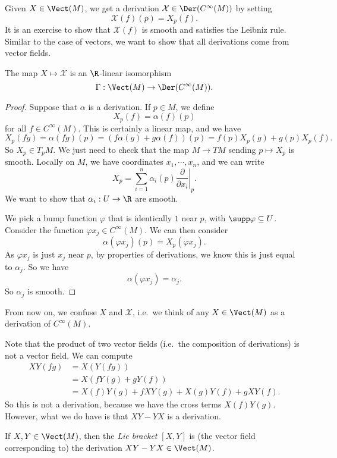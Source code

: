 \documentclass[a4paper]{article}
\begin{document}
Given $X \in \Vect(M)$, we get a derivation $\mathcal{X} \in \Der(C^\infty(M))$ by setting
\[
  \mathcal{X}(f)(p) = X_p(f).
\]
It is an exercise to show that $\mathcal{X}(f)$ is smooth and satisfies the Leibniz rule. Similar to the case of vectors, we want to show that all derivations come from vector fields.

\begin{lemma}
  The map $X \mapsto \mathcal{X}$ is an $\R$-linear isomorphism
  \[
    \Gamma: \Vect(M) \to \Der(C^\infty(M)).
  \]
\end{lemma}

\begin{proof}
  Suppose that $\alpha$ is a derivation. If $p \in M$, we define
  \[
    X_p(f) = \alpha(f)(p)
  \]
  for all $f \in C^\infty(M)$. This is certainly a linear map, and we have
  \[
    X_p(fg) = \alpha(fg)(p) = (f\alpha(g) + g\alpha(f))(p) = f(p) X_p(g) + g(p) X_p(f).
  \]
  So $X_p \in T_p M$. We just need to check that the map $M \to TM$ sending $p \mapsto X_p$ is smooth. Locally on $M$, we have coordinates $x_1, \cdots, x_n$, and we can write
  \[
    X_p = \sum_{i = 1}^n \alpha_i(p) \left.\frac{\partial}{\partial x_i}\right|_p.
  \]
  We want to show that $\alpha_i: U \to \R$ are smooth.

  We pick a bump function $\varphi$ that is identically $1$ near $p$, with $\supp \varphi \subseteq U$. Consider the function $\varphi x_j \in C^\infty(M)$. We can then consider
  \[
    \alpha(\varphi x_j)(p) = X_p(\varphi x_j).
  \]
  As $\varphi x_j$ is just $x_j$ near $p$, by properties of derivations, we know this is just equal to $\alpha_j$. So we have
  \[
    \alpha(\varphi x_j) = \alpha_j.
  \]
  So $\alpha_j$ is smooth.
\end{proof}

From now on, we confuse $X$ and $\mathcal{X}$, i.e.\ we think of any $X \in \Vect(M)$ as a derivation of $C^\infty(M)$.

Note that the product of two vector fields (i.e.\ the composition of derivations) is not a vector field. We can compute
\begin{align*}
  XY(fg) &= X(Y(fg)) \\
  &= X(fY(g) + gY(f)) \\
  &= X(f) Y(g) + fXY(g) + X(g) Y(f) + g XY(f).
\end{align*}
So this is not a derivation, because we have the cross terms $X(f) Y(g)$. However, what we do have is that $XY - YX$ is a derivation.
\begin{defi}
  If $X, Y \in \Vect(M)$, then the \emph{Lie bracket} $[X, Y]$ is (the vector field corresponding to) the derivation $XY - YX \in \Vect(M)$.
\end{defi}
\end{document}
